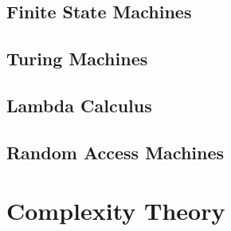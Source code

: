 \subsection{Finite State Machines}

\subsection{Turing Machines}




\subsection{Lambda Calculus}



\subsection{Random Access Machines}



\section{Complexity Theory}





